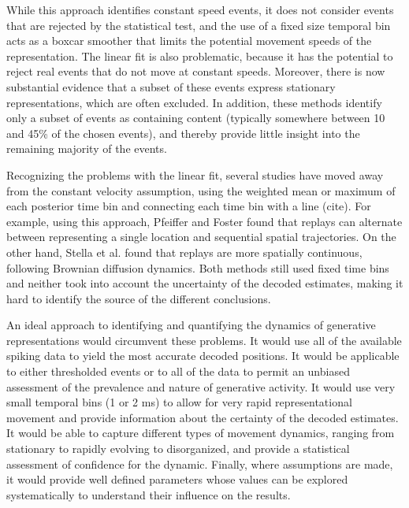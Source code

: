 \documentclass[times, twoside]{zHenriquesLab-StyleBioRxiv}
\begin{document}
While this approach identifies constant speed events, it does not consider events that are rejected by the statistical test, and the use of a fixed size temporal bin acts as a boxcar smoother that limits the potential movement speeds of the representation. The linear fit is also problematic, because it has the potential to reject real events that do not move at constant speeds. Moreover, there is now substantial evidence that a subset of these events express stationary representations, which are often excluded. In addition, these methods identify only a subset of events as containing content (typically somewhere between 10 and 45\% of the chosen events), and thereby provide little insight into the remaining majority of the events.

 Recognizing the problems with the linear fit, several studies have moved away from the constant velocity assumption, using the weighted mean or maximum of each posterior time bin and connecting each time bin with a line (cite). For example, using this approach, Pfeiffer and Foster \cite{PfeifferAutoassociativedynamicsgeneration2015} found that replays can alternate between representing a single location and sequential spatial trajectories. On the other hand, Stella et al. found that replays are more spatially continuous, following Brownian diffusion dynamics. Both methods still used fixed time bins and neither took into account the uncertainty of the decoded estimates, making it hard to identify the source of the different conclusions.

An ideal approach to identifying and quantifying the dynamics of generative representations would circumvent these problems. It would use all of the available spiking data to yield the most accurate decoded positions. It would be applicable to either thresholded events or to all of the data to permit an unbiased assessment of the prevalence and nature of generative activity. It would use very small temporal bins (1 or 2 ms) to allow for very rapid representational movement and provide information about the certainty of the decoded estimates. It would be able to capture different types of movement dynamics, ranging from stationary to rapidly evolving to disorganized, and provide a statistical assessment of confidence for the dynamic. Finally, where assumptions are made, it would provide well defined parameters whose values can be explored systematically to understand their influence on the results.
\end{document}
